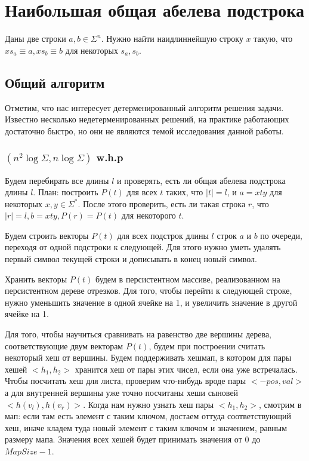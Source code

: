 \section{Наибольшая общая абелева подстрока}
\begin{problem}
Даны две строки $a, b \in \Sigma^n$. Нужно найти наидлиннейшую строку $x$ такую, что $xs_a \equiv a, xs_b \equiv b$ для некоторых $s_a, s_b$.
\end{problem}

\subsection{Общий алгоритм}

Отметим, что нас интересует детерменированный алгоритм решения задачи. Известно несколько недетерменированных решений, на практике работающих достаточно быстро, но они не являются темой исследования данной работы.

\subsubsection{$(n^2 \log \Sigma, n \log \Sigma)$ w.h.p}

Будем перебирать все длины $l$ и проверять, есть ли общая абелева подстрока длины $l$.
План: построить $P(t)$ для всех $t$ таких, что $|t|=l$, и $a=xty$ для некоторых $x, y \in \Sigma^*$. После этого проверить, есть ли такая строка $r$, что $|r|=l, b=xty, P(r)=P(t)$ для некоторого $t$.

Будем строить векторы $P(t)$ для всех подстрок длины $l$ строк $a$ и $b$ по очереди, переходя от одной подстроки к следующей. Для этого нужно уметь удалять первый символ текущей строки и дописывать в конец новый символ.

Хранить векторы $P(t)$ будем в персистентном массиве, реализованном на персистентном дереве отрезков. Для того, чтобы перейти к следующей строке, нужно уменьшить значение в одной ячейке на 1, и увеличить значение в другой ячейке на 1.

Для того, чтобы научиться сравнивать на равенство две вершины дерева, соответствующие двум векторам $P(t)$, будем при построении считать некоторый хеш от вершины. Будем поддерживать хешмап, в котором для пары хешей $<h_1, h_2>$ хранится хеш от пары этих чисел, если она уже встречалась. Чтобы посчитать хеш для листа, проверим что-нибудь вроде пары $<-pos, val>$ а для внутренней вершины уже точно посчитаны хеши сыновей $<h(v_l), h(v_r)>$. Когда нам нужно узнать хеш пары $<h_1, h_2>$, смотрим в мап: если там есть элемент с таким ключом, достаем оттуда соответствующий хеш, иначе кладем туда новый элемент с таким ключом и значением, равным размеру мапа. Значения всех хешей будет принимать значения от $0$ до $MapSize - 1$.

